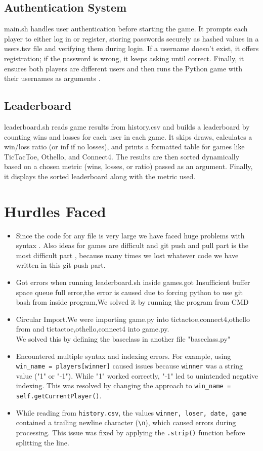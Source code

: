 \documentclass{article}
\begin{document}
\subsection{Authentication System }
main.sh handles user authentication before starting the game. It prompts each player to either log in or register, storing passwords securely as hashed values in a users.tsv file and verifying them during login. If a username doesn’t exist, it offers registration; if the password is wrong, it keeps asking until correct. Finally, it ensures both players are different users and then runs the Python game with their usernames as arguments \cite{bash_docs}.
\subsection{Leaderboard}
leaderboard.sh reads game results from history.csv and builds a leaderboard by counting wins and losses for each user in each game. It skips draws, calculates a win/loss ratio (or inf if no losses), and prints a formatted table for games like TicTacToe, Othello, and Connect4. The results are then sorted dynamically based on a chosen metric (wins, losses, or ratio) passed as an argument. Finally, it displays the sorted leaderboard along with the metric used.
\section{Hurdles Faced}
\begin{itemize}
\item{Since the code for any file is very large we have faced huge problems with syntax . Also ideas for games are difficult and git push and pull part is the most difficult part , because many times we lost whatever code we have written in this git push part.}
\item{Got errors when running leaderboard.sh inside games.got Insufficient buffer space queue full error,the error is caused due to forcing python to use git bash from inside program,We solved it by running the program from CMD}
\item{Circular Import.We were importing game.py into tictactoe,connect4,othello from and tictactoe,othello,connect4 into game.py.\\We solved this by defining the baseclass in another file "baseclass.py" }
\item Encountered multiple syntax and indexing errors. For example, using \texttt{win\_name = players[winner]} caused issues because \texttt{winner} was a string value ("1" or "-1"). While "1" worked correctly, "-1" led to unintended negative indexing. This was resolved by changing the approach to \texttt{win\_name = self.getCurrentPlayer()}.

\item While reading from \texttt{history.csv}, the values \texttt{winner, loser, date, game} contained a trailing newline character (\texttt{\textbackslash n}), which caused errors during processing. This issue was fixed by applying the \texttt{.strip()} function before splitting the line.
\end{itemize}
\end{document}
